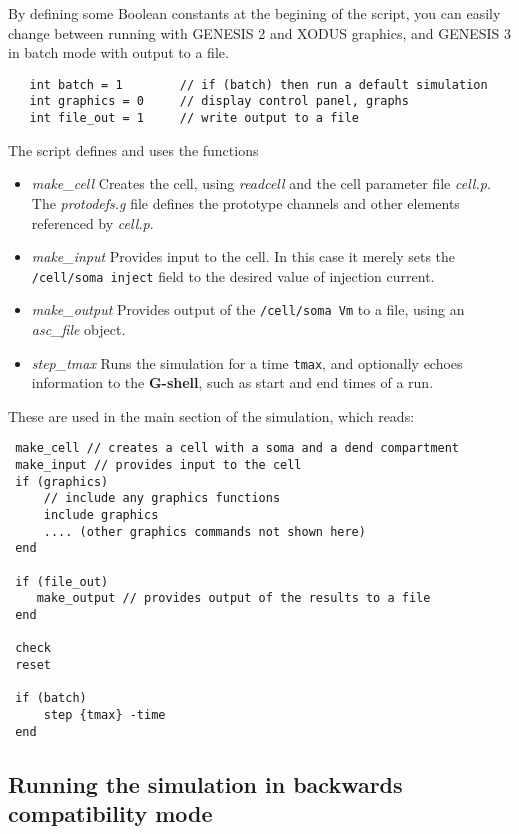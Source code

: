 \documentclass[12pt]{article}
\begin{document}
By defining some Boolean constants at the begining of the script,
you can easily change between running with GENESIS 2 and XODUS graphics,
and GENESIS 3 in batch mode with output to a file.
\begin{verbatim}
   int batch = 1        // if (batch) then run a default simulation
   int graphics = 0     // display control panel, graphs
   int file_out = 1     // write output to a file
\end{verbatim}
The script defines and uses the functions
\begin{itemize}
\item {\it make\_cell} Creates the cell, using {\it readcell} and the cell parameter file
     {\it cell.p}.  The {\it protodefs.g} file defines the prototype channels and
     other elements referenced by {\it cell.p}.

\item {\it make\_input} Provides input to the cell.  In this case it merely
     sets the {\tt /cell/soma inject} field to the desired value of injection
     current.

\item {\it make\_output} Provides output of the {\tt /cell/soma Vm}  to a file, using
     an {\it asc\_file} object.

\item {\it step\_tmax} Runs the simulation for a time {\tt tmax}, and optionally
     echoes information to the {\bf G-shell}, such as start and end times of a
     run.
\end{itemize}
These are used in the main section of the simulation, which reads:
\begin{verbatim}
 make_cell // creates a cell with a soma and a dend compartment
 make_input // provides input to the cell
 if (graphics)
     // include any graphics functions
     include graphics
     .... (other graphics commands not shown here)
 end

 if (file_out)
    make_output // provides output of the results to a file
 end

 check
 reset

 if (batch)
     step {tmax} -time
 end
\end{verbatim}

\subsection*{Running the simulation in backwards compatibility mode}
\end{document}
